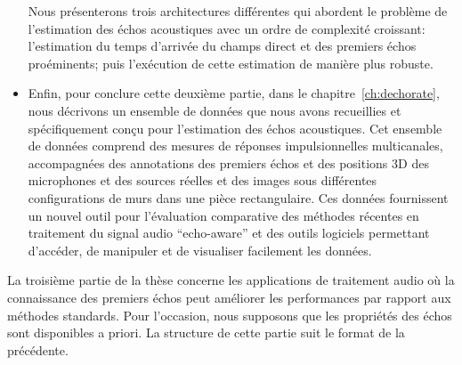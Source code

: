 \begin{itemize}
    Nous présenterons trois architectures différentes qui abordent le problème de l'estimation des échos acoustiques avec un ordre de complexité croissant:
    l'estimation du temps d'arrivée du champs direct et des premiers échos proéminents;
    puis l'exécution de cette estimation de manière plus robuste.
    \item
    Enfin, pour conclure cette deuxième partie, dans le chapitre~\ref{ch:dechorate}, nous décrivons un ensemble de données que nous avons recueillies et spécifiquement conçu pour l'estimation des échos acoustiques.
    Cet ensemble de données comprend des mesures de réponses impulsionnelles multicanales, accompagnées des annotations des premiers échos et des positions 3D des microphones et des sources réelles et des images sous différentes configurations de murs dans une pièce rectangulaire.
    Ces données fournissent un nouvel outil pour l'évaluation comparative des méthodes récentes en traitement du signal audio ``echo-aware'' et des outils logiciels permettant d'accéder, de manipuler et de visualiser facilement les données.
\end{itemize}

La troisième partie de la thèse concerne les applications de traitement audio où la connaissance des premiers échos peut améliorer les performances par rapport aux méthodes standards.
Pour l'occasion, nous supposons que les propriétés des échos sont disponibles a priori.
La structure de cette partie suit le format de la précédente.

